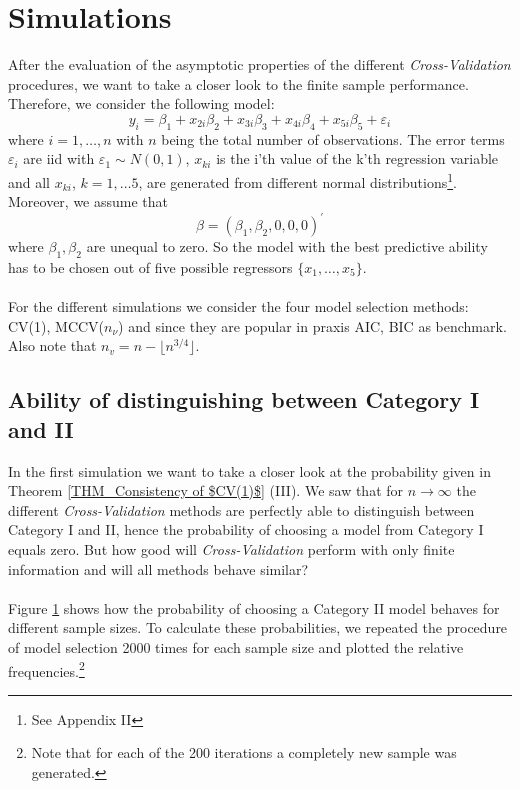 \documentclass[Research_Module_ES.tex]{subfiles}
\begin{document}
\section{Simulations}
\label{Simulation1}
After the evaluation of the asymptotic properties of the different \textit{Cross-Validation} procedures, we want to take a closer look to the finite sample performance. Therefore, we consider the following model:
\begin{equation}
\label{SimulationModel}
y_i=\beta_1+x_{2i}\beta_2+x_{3i}\beta_3+x_{4i}\beta_4+x_{5i}\beta_5+\varepsilon_i
\end{equation}
where $i=1,\ldots,n$ with $n$ being the total number of observations. The error terms $\varepsilon_i$ are iid with $\varepsilon_1\sim N(0,1)$,  $x_{ki}$ is the i'th value of the k'th regression variable and all $x_{ki}$, $k=1,\ldots5$, are generated from different normal distributions\footnote{See Appendix II}. Moreover, we assume that
\[
	\beta=(\beta_1,\beta_2,0,0,0)^\prime
\]
where $\beta_1,\beta_2$ are unequal to zero. So the model with the best predictive ability has to be chosen out of five possible regressors $\{x_1,\ldots,x_5\}$. \\
\\
For the different simulations we consider the four model selection methods: CV(1), MCCV($n_\nu$) and since they are popular in praxis AIC, BIC as benchmark. Also note that $n_v=n-\lfloor n^{3/4}\rfloor$.

\subsection{Ability of distinguishing between Category I and II }
In the first simulation we want to take a closer look at the probability given in Theorem \ref{THM_Consistency of $CV(1)$} (III). We saw that for $n\to\infty$ the different \textit{Cross-Validation} methods are perfectly able to distinguish between Category I and II, hence the probability of choosing a model from Category I equals zero. But how good will \textit{Cross-Validation} perform with only finite information and will all methods behave similar?\\
\\
Figure \ref{Simulation1} shows how the probability of choosing a Category II model behaves for different sample sizes. To calculate these probabilities, we repeated the procedure of model selection 2000 times for each sample size and plotted the relative frequencies.\footnote{Note that for each of the 200 iterations a completely new sample was generated.}
\end{document}
